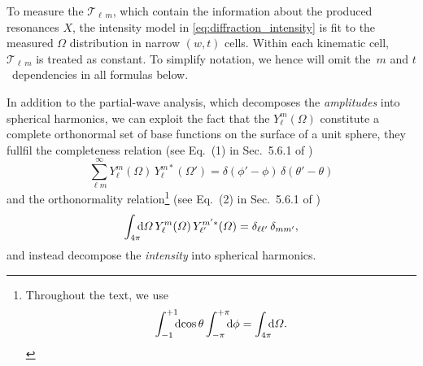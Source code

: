 To measure the $\mathcal{T\!}_{\ell\, m}$, which contain the information
about the produced resonances $X$, the intensity model in
\cref{eq:diffraction_intensity} is fit to the measured $\Omega$
distribution in narrow $(w, t)$ cells.  Within each kinematic cell,
$\mathcal{T\!}_{\ell\, m}$ is treated as constant.  To simplify notation,
we hence will omit the~$m$ and $t$~dependencies in all formulas below.

In addition to the partial-wave analysis, which decomposes the
\emph{amplitudes} into spherical harmonics, we can exploit the fact
that the $Y_\ell^m(\Omega)$ constitute a complete orthonormal set of
base functions on the surface of a unit sphere, \ie they fullfil the
completeness relation (see Eq.~(1) in Sec.~5.6.1 of
)
\begin{equation}
  \label{eq:spherical_harm_complete}
  \sum_{\ell m}^\infty Y_\ell^m(\Omega)\, Y_\ell^{m *}(\Omega')
  = \delta(\phi' - \phi)\, \delta(\theta' - \theta)
\end{equation}
and the orthonormality relation\footnote{%
Throughout the text, we use
\begin{equation}
  \int_{-1}^{+1}\!\!\! \dif{\cos\theta} \int_{-\pi}^{+\pi}\!\!\! \dif{\phi}
  = \int_{4 \pi}\!\!\! \dif{\Omega}.
\end{equation}
} (see Eq.~(2) in Sec.~5.6.1 of )
\begin{equation}
  \label{eq:spherical_harm_orthonorm}
  \int_{4 \pi}\!\!\! \dif{\Omega}\, Y_\ell^m(\Omega)\, Y_{\ell'}^{m' *}(\Omega)
  = \delta_{\ell \ell'}\, \delta_{m m'},
\end{equation}
and instead decompose the \emph{intensity} into spherical harmonics.

